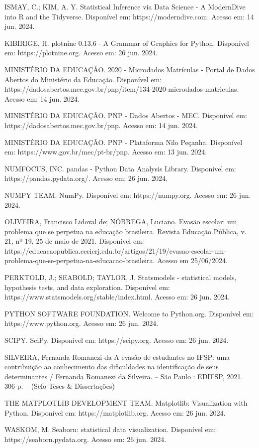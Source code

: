 \documentclass[conference]{IEEEtran}
\begin{document}
\begin{thebibliography}{00}

ISMAY, C.; KIM, A. Y. Statistical Inference via Data Science - A ModernDive into R and the Tidyverse. Disponível em: https://moderndive.com. Acesso em: 14 jun. 2024.

KIBIRIGE, H. plotnine 0.13.6 - A Grammar of Graphics for Python. Disponível em: https://plotnine.org. Acesso em: 26 jun. 2024.

MINISTÉRIO DA EDUCAÇÃO. 2020 - Microdados Matrículas - Portal de Dados Abertos do Ministério da Educação. Disponível em: https://dadosabertos.mec.gov.br/pnp/item/134-2020-microdados-matriculas. Acesso em: 14 jun. 2024. 

 MINISTÉRIO DA EDUCAÇÃO. PNP - Dados Abertos - MEC. Disponível em: https://dadosabertos.mec.gov.br/pnp. Acesso em: 14 jun. 2024.

 MINISTÉRIO DA EDUCAÇÃO. PNP - Plataforma Nilo Peçanha. Disponível em: https://www.gov.br/mec/pt-br/pnp. Acesso em: 13 jun. 2024.

 NUMFOCUS, INC. pandas - Python Data Analysis Library. Disponível em: https://pandas.pydata.org/. Acesso em: 26 jun. 2024.

NUMPY TEAM. NumPy. Disponível em: https://numpy.org. Acesso em: 26 jun. 2024.

 OLIVEIRA, Francisco Lidoval de; NÓBREGA, Luciano. Evasão escolar: um problema que se perpetua na educação brasileira. Revista Educação Pública, v. 21, nº 19, 25 de maio de 2021. Disponível em: https://educacaopublica.cecierj.edu.br/artigos/21/19/evasao-escolar-um-problema-que-se-perpetua-na-educacao-brasileira. Acesso em 25/06/2024.

PERKTOLD, J.; SEABOLD; TAYLOR, J. Statsmodels - statistical models, hypothesis tests, and data exploration. Disponível em: https://www.statsmodels.org/stable/index.html. Acesso em: 26 jun. 2024. 

 PYTHON SOFTWARE FOUNDATION. Welcome to Python.org. Disponível em: https://www.python.org. Acesso em: 26 jun. 2024. 

SCIPY. SciPy. Disponível em: https://scipy.org. Acesso em: 26 jun. 2024. 

 SILVEIRA, Fernanda Romanezi da
A evasão de estudantes no IFSP: uma contribuição ao
conhecimento das dificuldades na identificação de seus
determinantes / Fernanda Romanezi da Silveira. – São Paulo :
EDIFSP, 2021. 306 p. – (Selo Teses \& Dissertações)

THE MATPLOTLIB DEVELOPMENT TEAM. Matplotlib: Visualization with Python. Disponível em: https://matplotlib.org. Acesso em: 26 jun. 2024. 

WASKOM, M. Seaborn: statistical data visualization. Disponível em: https://seaborn.pydata.org. Acesso em: 26 jun. 2024.

\end{thebibliography}
\end{document}
